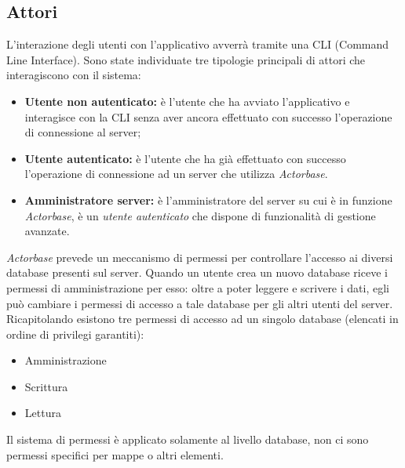 \documentclass[a4paper]{article}
\begin{document}
		\subsection{Attori}
		L'interazione degli utenti con l'applicativo avverrà tramite una CLI (Command Line Interface).
		Sono state individuate tre tipologie principali di attori che interagiscono con il sistema:
		\begin{itemize}
			\item \textbf{Utente non autenticato:} è l'utente che ha avviato l'applicativo e interagisce con la CLI senza aver ancora effettuato con successo l'operazione di connessione al server;
			\item \textbf{Utente autenticato:} è l'utente che ha già effettuato con successo l'operazione di connessione ad un server che utilizza \emph{Actorbase}. 
			\item \textbf{Amministratore server:} è l'amministratore del server su cui è in funzione \emph{Actorbase}, è un \emph{utente autenticato} che dispone di funzionalità di gestione avanzate.
		\end{itemize}
		\emph{Actorbase} prevede un meccanismo di permessi per controllare l'accesso ai diversi database presenti sul server. Quando un utente crea un nuovo database riceve i permessi di amministrazione per esso: oltre a poter leggere e scrivere i dati, egli può cambiare i permessi di accesso a tale database per gli altri utenti del server. \\ 
		Ricapitolando esistono tre permessi di accesso ad un singolo database (elencati in ordine di privilegi garantiti):
		\begin{itemize}
		\item Amministrazione
		\item Scrittura
		\item Lettura
		\end{itemize}
		Il sistema di permessi è applicato solamente al livello database, non ci sono permessi specifici per mappe o altri elementi.
\end{document}
